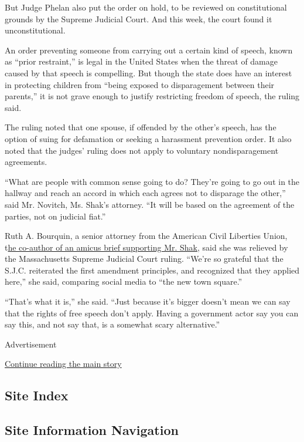 But Judge Phelan also put the order on hold, to be reviewed on
constitutional grounds by the Supreme Judicial Court. And this week, the
court found it unconstitutional.

An order preventing someone from carrying out a certain kind of speech,
known as ``prior restraint,'' is legal in the United States when the
threat of damage caused by that speech is compelling. But though the
state does have an interest in protecting children from ``being exposed
to disparagement between their parents,'' it is not grave enough to
justify restricting freedom of speech, the ruling said.

The ruling noted that one spouse, if offended by the other's speech, has
the option of suing for defamation or seeking a harassment prevention
order. It also noted that the judges' ruling does not apply to voluntary
nondisparagement agreements.

``What are people with common sense going to do? They're going to go out
in the hallway and reach an accord in which each agrees not to disparage
the other,'' said Mr. Novitch, Ms. Shak's attorney. ``It will be based
on the agreement of the parties, not on judicial fiat.''

Ruth A. Bourquin, a senior attorney from the American Civil Liberties
Union,
t\href{https://www.ma-appellatecourts.org/pdf/SJC-12748/SJC-12748_05_Amicus_ACLU_Brief.pdf}{he
co-author of an amicus brief supporting Mr. Shak}, said she was relieved
by the Massachusetts Supreme Judicial Court ruling. ``We're so grateful
that the S.J.C. reiterated the first amendment principles, and
recognized that they applied here,'' she said, comparing social media to
``the new town square.''

``That's what it is,'' she said. ``Just because it's bigger doesn't mean
we can say that the rights of free speech don't apply. Having a
government actor say you can say this, and not say that, is a somewhat
scary alternative.''

Advertisement

\protect\hyperlink{after-bottom}{Continue reading the main story}

\hypertarget{site-index}{%
\subsection{Site Index}\label{site-index}}

\hypertarget{site-information-navigation}{%
\subsection{Site Information
Navigation}\label{site-information-navigation}}

